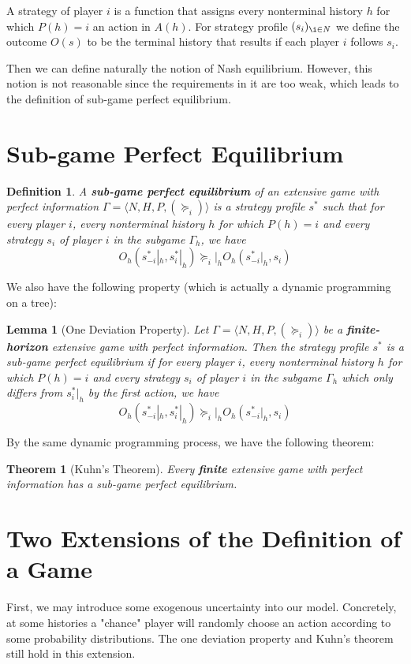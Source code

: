 \documentclass[openany]{book}
\newtheorem{definition}{Definition}[chapter]
\newtheorem{theorem}{Theorem}[chapter]
\newtheorem{lemma}{Lemma}[chapter]
\begin{document}
A strategy of player $i$ is a function that assigns every nonterminal history $h$ for which $P(h)=i$ an action in $A(h)$.
For strategy profile $(s_i)_{\i\in N}$ we define the outcome $O(s)$ to be the terminal history that results if each player $i$ follows $s_i$.

Then we can define naturally the notion of Nash equilibrium. However, this notion is not reasonable since the requirements in it are too weak, which leads to the definition of sub-game perfect equilibrium.

\section{Sub-game Perfect Equilibrium}
\begin{definition}
A \textbf{sub-game perfect equilibrium} of an extensive game with perfect information $\Gamma=\langle N,H,P,(\succeq_i)\rangle$ is a strategy profile $s^*$ such that for every player $i$, every nonterminal history $h$ for which $P(h)=i$ and every strategy $s_i$ of player $i$ in the subgame $\Gamma_h$, we have
\begin{equation}
O_h(s^*_{-i}|_h,s^*_i|_h)\succeq_i|_hO_h(s^*_{-i}|_h,s_i)
\end{equation}
\end{definition}
We also have the following property (which is actually a dynamic programming on a tree):
\begin{lemma}[One Deviation Property]
Let $\Gamma=\langle N,H,P,(\succeq_i)\rangle$ be a \textbf{finite-horizon} extensive game with perfect information. Then the strategy profile $s^*$ is a sub-game perfect equilibrium if for every player $i$, every nonterminal history $h$ for which $P(h)=i$ and every strategy $s_i$ of player $i$ in the subgame $\Gamma_h$ which only differs from $s^*_i|_h$ by the first action, we have
\begin{equation}
O_h(s^*_{-i}|_h,s^*_i|_h)\succeq_i|_hO_h(s^*_{-i}|_h,s_i)
\end{equation}
\end{lemma}

By the same dynamic programming process, we have the following theorem:
\begin{theorem}[Kuhn's Theorem]
Every \textbf{finite} extensive game with perfect information has a sub-game perfect equilibrium.
\end{theorem}

\section{Two Extensions of the Definition of a Game}
First, we may introduce some exogenous uncertainty into our model. Concretely, at some histories a "chance" player will randomly choose an action according to some probability distributions. The one deviation property and Kuhn's theorem still hold in this extension.
\end{document}
